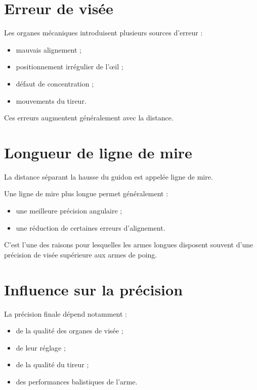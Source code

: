 \section{Erreur de visée}

Les organes mécaniques introduisent plusieurs sources d'erreur :

\begin{itemize}
    \item mauvais alignement ;
    \item positionnement irrégulier de l'œil ;
    \item défaut de concentration ;
    \item mouvements du tireur.
\end{itemize}

Ces erreurs augmentent généralement avec la distance.

\section{Longueur de ligne de mire}

La distance séparant la hausse du guidon est appelée ligne de mire.

Une ligne de mire plus longue permet généralement :

\begin{itemize}
    \item une meilleure précision angulaire ;
    \item une réduction de certaines erreurs d'alignement.
\end{itemize}

C'est l'une des raisons pour lesquelles les armes longues disposent souvent
d'une précision de visée supérieure aux armes de poing.

\section{Influence sur la précision}

La précision finale dépend notamment :

\begin{itemize}
    \item de la qualité des organes de visée ;
    \item de leur réglage ;
    \item de la qualité du tireur ;
    \item des performances balistiques de l'arme.
\end{itemize}

